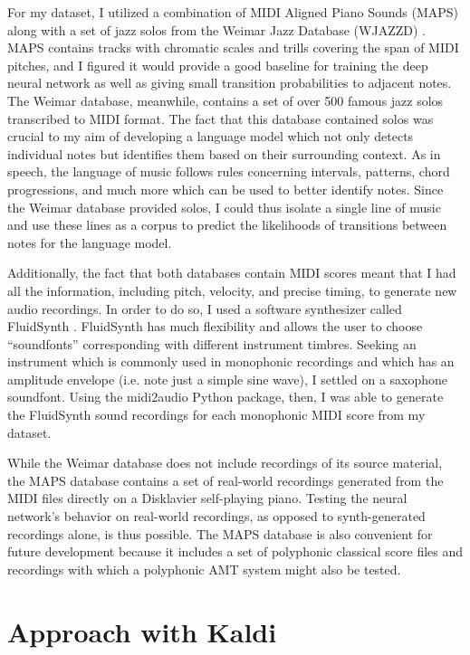 \documentclass[conference]{IEEEtran}
\begin{document}
For my dataset, I utilized a combination of MIDI Aligned Piano Sounds (MAPS) along with a set of jazz solos from the Weimar Jazz Database (WJAZZD) \cite{maps} \cite{jazz} . MAPS contains tracks with chromatic scales and trills covering the span of MIDI pitches, and I figured it would provide a good baseline for training the deep neural network as well as giving small transition probabilities to adjacent notes. The Weimar database, meanwhile, contains a set of over 500 famous jazz solos transcribed to MIDI format. The fact that this database contained solos was crucial to my aim of developing a language model which not only detects individual notes but identifies them based on their surrounding context. As in speech, the language of music follows rules concerning intervals, patterns, chord progressions, and much more which can be used to better identify notes. Since the Weimar database provided solos, I could thus isolate a single line of music and use these lines as a corpus to predict the likelihoods of transitions between notes for the language model. 

Additionally, the fact that both databases contain MIDI scores meant that I had all the information, including pitch, velocity, and precise timing, to generate new audio recordings. In order to do so, I used a software synthesizer called FluidSynth \cite{fluid}. FluidSynth has much flexibility and allows the user to choose ``soundfonts'' corresponding with different instrument timbres. Seeking an instrument which is commonly used in monophonic recordings and which has an amplitude envelope (i.e. note just a simple sine wave), I settled on a saxophone soundfont. Using the midi2audio Python package, then, I was able to generate the FluidSynth sound recordings for each monophonic MIDI score from my dataset. 

While the Weimar database does not include recordings of its source material, the MAPS database contains a set of real-world recordings generated from the MIDI files directly on a Disklavier self-playing piano. Testing the neural network's behavior on real-world recordings, as opposed to synth-generated recordings alone, is thus possible. The MAPS database is also convenient for future development because it includes a set of polyphonic classical score files and recordings with which a polyphonic AMT system might also be tested.

\section{Approach with Kaldi}
\end{document}
